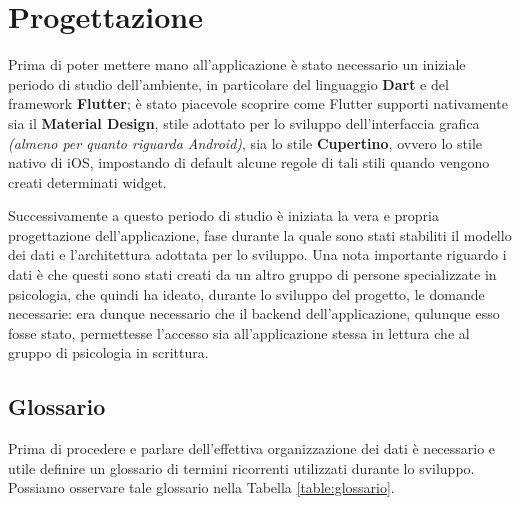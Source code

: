\chapter{Progettazione}
Prima di poter mettere mano all'applicazione è stato necessario un iniziale periodo di studio dell'ambiente, in particolare del linguaggio \textbf{Dart} e del framework \textbf{Flutter}; è stato piacevole scoprire come Flutter supporti nativamente sia il \textbf{Material Design}, stile adottato per lo sviluppo dell'interfaccia grafica \textit{(almeno per quanto riguarda Android)}, sia lo stile \textbf{Cupertino}, ovvero lo stile nativo di iOS, impostando di default alcune regole di tali stili quando vengono creati determinati widget.

Successivamente a questo periodo di studio è iniziata la vera e propria progettazione dell'applicazione, fase durante la quale sono stati stabiliti il modello dei dati e l'architettura adottata per lo sviluppo. Una nota importante riguardo i dati è che questi sono stati creati da un altro gruppo di persone specializzate in psicologia, che quindi ha ideato, durante lo sviluppo del progetto, le domande necessarie: era dunque necessario che il backend dell'applicazione, qulunque esso fosse stato, permettesse l'accesso sia all'applicazione stessa in lettura che al gruppo di psicologia in scrittura.

\newpage

\section{Glossario}
Prima di procedere e parlare dell'effettiva organizzazione dei dati è necessario e utile definire un glossario di termini ricorrenti utilizzati durante lo sviluppo. Possiamo osservare tale glossario nella Tabella \ref{table:glossario}.



